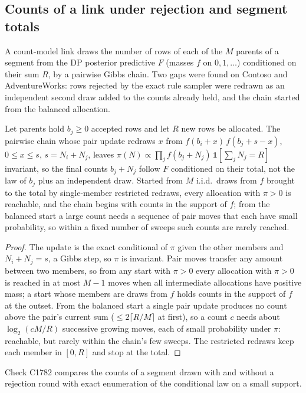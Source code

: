 \subsection*{Counts of a link under rejection and segment totals}
A count-model link draws the number of rows of each of the $M$ parents of a segment from the DP posterior predictive $F$ (masses $f$ on $0,1,\dots$) conditioned on their sum $R$, by a pairwise Gibbs chain. Two gaps were found on Contoso and AdventureWorks: rows rejected by the exact rule sampler were redrawn as an independent second draw added to the counts already held, and the chain started from the balanced allocation.

\setcounter{proposition}{1781}
\begin{proposition}\label{prop:basecounts}
Let parents hold $b_j\ge 0$ accepted rows and let $R$ new rows be allocated. The pairwise chain whose pair update redraws $x$ from $f(b_i+x)\,f(b_j+s-x)$, $0\le x\le s$, $s=N_i+N_j$, leaves $\pi(N)\propto\prod_j f(b_j+N_j)\,\mathbf 1[\sum_j N_j=R]$ invariant, so the final counts $b_j+N_j$ follow $F$ conditioned on their total, not the law of $b_j$ plus an independent draw. Started from $M$ i.i.d.\ draws from $f$ brought to the total by single-member restricted redraws, every allocation with $\pi>0$ is reachable, and the chain begins with counts in the support of $f$; from the balanced start a large count needs a sequence of pair moves that each have small probability, so within a fixed number of sweeps such counts are rarely reached.
\end{proposition}
\begin{proof}
The update is the exact conditional of $\pi$ given the other members and $N_i+N_j=s$, a Gibbs step, so $\pi$ is invariant. Pair moves transfer any amount between two members, so from any start with $\pi>0$ every allocation with $\pi>0$ is reached in at most $M-1$ moves when all intermediate allocations have positive mass; a start whose members are draws from $f$ holds counts in the support of $f$ at the outset. From the balanced start a single pair update produces no count above the pair's current sum ($\le 2\lceil R/M\rceil$ at first), so a count $c$ needs about $\log_2(cM/R)$ successive growing moves, each of small probability under $\pi$: reachable, but rarely within the chain's few sweeps. The restricted redraws keep each member in $[0,R]$ and stop at the total.
\end{proof}
\noindent Check C1782 compares the counts of a segment drawn with and without a rejection round with exact enumeration of the conditional law on a small support.

